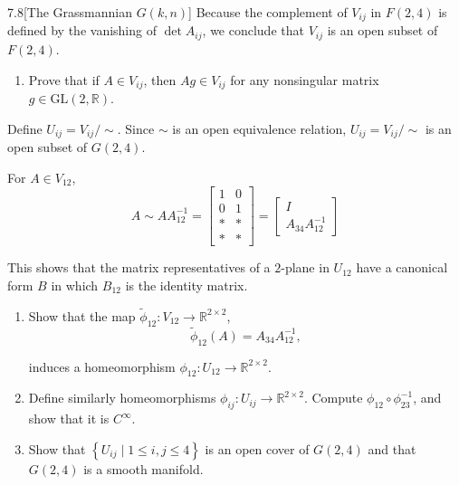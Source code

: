 \begin{problem}{7.8}[The Grassmannian \(G(k, n)\)]
Because the complement of \(V_{ij}\) in \(F(2,4)\) is defined by the vanishing of \( \det A_{ij} \), we conclude that \( V_{ij} \) is an open subset of \( F(2, 4) \).

\begin{enumerate}[label={(\alph*)}, resume]
	\item Prove that if \( A \in V_{ij} \), then \( Ag \in V_{ij} \) for any nonsingular matrix \( g \in \mathrm{GL}(2, \mathbb{R}) \).
\end{enumerate}

Define \( U_{ij} = V_{ij}/\!\sim \). Since \( \sim \) is an open equivalence relation, \( U_{ij} = V_{ij}/\!\sim \) is an open subset of \( G(2, 4) \).

For \( A \in V_{12} \),
\[
	A \sim AA_{12}^{-1} = \begin{bmatrix}
		1 & 0 \\
		0 & 1 \\
		* & * \\
		* & *
	\end{bmatrix} = \begin{bmatrix}
		I \\
		A_{34}A_{12}^{-1}
	\end{bmatrix}
\]

This shows that the matrix representatives of a \(2\)-plane in \( U_{12} \) have a canonical form \(B\) in which \( B_{12} \) is the identity matrix.
\begin{enumerate}[label={(\alph*)}, resume]
	\item Show that the map \( \tilde{\phi}_{12}: V_{12} \to \mathbb{R}^{2\times 2} \),
	      \[
		      \tilde{\phi}_{12}(A) = A_{34}A_{12}^{-1},
	      \]

	      induces a homeomorphism \( \phi_{12}: U_{12} \to \mathbb{R}^{2\times 2} \).
	\item Define similarly homeomorphisms \( \phi_{ij}: U_{ij} \to \mathbb{R}^{2\times 2} \). Compute \( \phi_{12} \circ \phi_{23}^{-1} \), and show that it is \( C^{\infty} \).
	\item Show that \( \left\{ U_{ij} \mid 1 \leq i, j\leq 4 \right\} \) is an open cover of \( G(2, 4) \) and that \( G(2, 4) \) is a smooth manifold.
\end{enumerate}
\end{problem}

